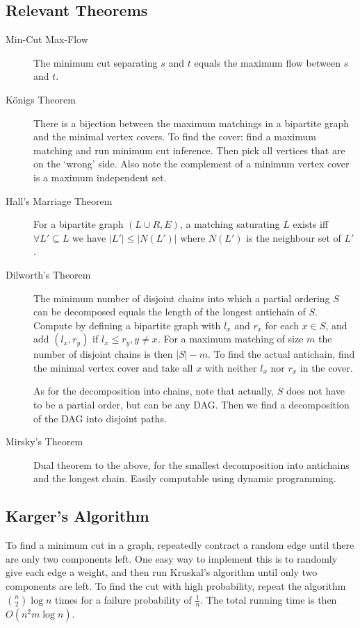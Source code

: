 \documentclass[
	a4paper,
	landscape,
	10pt,
	article
]{article}
\begin{document}
\subsection{Relevant Theorems}
\begin{description}
	\item[Min-Cut Max-Flow] The minimum cut separating $s$ and $t$ equals the
		maximum flow between $s$ and $t$.
	\item[K\"onigs Theorem] There is a bijection between the maximum matchings
		in a bipartite graph and the minimal vertex covers. To find the cover:
		find a maximum matching and run minimum cut inference. Then pick all
		vertices that are on the `wrong' side. Also note the complement of a
		minimum vertex cover is a maximum independent set.
	\item[Hall's Marriage Theorem] For a bipartite graph $(L \cup R, E)$, a
		matching saturating $L$ exists iff $\forall L' \subseteq L$ we have
		$|L'| \leq |N(L')|$ where $N(L')$ is the neighbour set of $L'$.
	\item[Dilworth's Theorem] The minimum number of disjoint chains into which
		a partial ordering $S$ can be decomposed equals the length of
		the longest antichain of
		$S$. Compute by defining a bipartite graph with $l_x$ and $r_x$ for
		each $x \in S$, and add $(l_x, r_y)$ if $l_x \leq r_y, y \neq x$. For
		a maximum matching of size $m$ the number of disjoint chains is then
		$|S|-m$. To find the actual antichain, find the minimal vertex cover
		and take all $x$ with neither $l_x$ nor $r_x$ in the cover.
		
		As for the decomposition into chains,
		note that actually, $S$ does not have to be a partial order, but can be
		any DAG. Then we find a decomposition of the DAG into disjoint paths.
	\item[Mirsky's Theorem] Dual theorem to the above, for the smallest
		decomposition into antichains and the longest chain. Easily computable
		using dynamic programming.
\end{description}

\subsection{Karger's Algorithm}
To find a minimum cut in a graph, repeatedly contract a random edge until there
are only two components left. One easy way to implement this is to randomly
give each edge a weight, and then run Kruskal's algorithm until only two
components are left. To find the cut with high probability, repeat the algorithm
$\binom{n}{2}\log{n}$ times for a failure probability of $\frac{1}{n}$. The
total running time is then $O(n^2 m \log{n})$.
\end{document}
